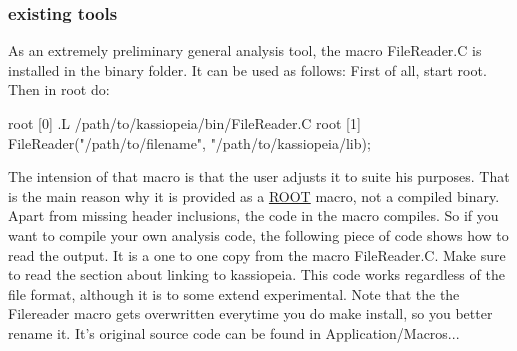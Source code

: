  \hypertarget{_k_s_output_KSTools}{}\subsubsection{existing tools}\label{_k_s_output_KSTools}
As an extremely preliminary general analysis tool, the macro FileReader.C is installed in the binary folder. It can be used as follows: First of all, start root. Then in root do: 
\begin{DoxyCode}
      root [0] .L /path/to/kassiopeia/bin/FileReader.C
      root [1]  FileReader("/path/to/filename", "/path/to/kassiopeia/lib);
\end{DoxyCode}
 The intension of that macro is that the user adjusts it to suite his purposes. That is the main reason why it is provided as a \hyperlink{namespace_r_o_o_t}{ROOT} macro, not a compiled binary. Apart from missing header inclusions, the code in the macro compiles. So if you want to compile your own analysis code, the following piece of code shows how to read the output. It is a one to one copy from the macro FileReader.C. Make sure to read the section about linking to kassiopeia. This code works regardless of the file format, although it is to some extend experimental. Note that the the Filereader macro gets overwritten everytime you do make install, so you better rename it. It's original source code can be found in Application/Macros...


